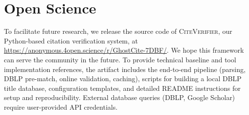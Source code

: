 \section*{Open Science}

To facilitate future research, we release the source code of \textsc{CiteVerifier}, our Python-based citation verification system, at \url{https://anonymous.4open.science/r/GhostCite-7DBF/}. We hope this framework can serve the community in the future. To provide technical baseline and tool implementation references, the artifact includes the end-to-end pipeline (parsing, DBLP pre-match, online validation, caching), scripts for building a local DBLP title database, configuration templates, and detailed README instructions for setup and reproducibility. External database queries (DBLP, Google Scholar) require user-provided API credentials.
